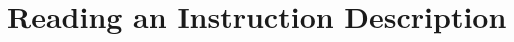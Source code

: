 \clearpage
\begingroup
\setlength{\parskip}{1pt}
\titlespacing*{\section}{0pt}{0.8em}{0.45em}
\titlespacing*{\subsection}{0pt}{0.45em}{0.25em}
\section*{Reading an Instruction Description}\label{page:reading-an-instruction-description}
{}
